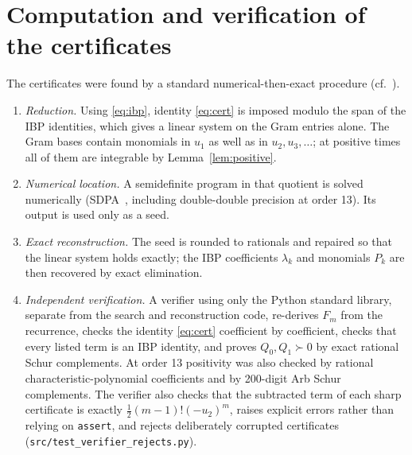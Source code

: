 \documentclass[11pt]{article}
\theoremstyle{definition}
\theoremstyle{remark}
\begin{document}
\section{Computation and verification of the certificates}\label{sec:computation}
The certificates were found by a standard numerical-then-exact procedure
(cf.~\cite{Parrilo03,PeyrlParrilo08}).
\begin{enumerate}[label=(\arabic*)]
\item \emph{Reduction.} Using \eqref{eq:ibp}, identity \eqref{eq:cert} is imposed
 modulo the span of the IBP identities, which gives a linear system on the Gram
 entries alone. The Gram bases contain monomials in $u_1$ as well as in
 $u_2,u_3,\dots$; at positive times all of them are integrable by
 Lemma~\ref{lem:positive}.
\item \emph{Numerical location.} A semidefinite program in that quotient is solved
 numerically (SDPA~\cite{SDPA03}, including double-double precision at order 13).
 Its output is used only as a seed.
\item \emph{Exact reconstruction.} The seed is rounded to rationals and repaired so
 that the linear system holds exactly; the IBP coefficients $\lambda_k$ and monomials
 $P_k$ are then recovered by exact elimination.
\item \emph{Independent verification.} A verifier using only the Python standard
 library, separate from the search and reconstruction code, re-derives $F_m$ from
 the recurrence, checks the identity \eqref{eq:cert} coefficient by coefficient,
 checks that every listed term is an IBP identity, and proves $Q_0,Q_1\succ0$ by
 exact rational Schur complements. At order 13 positivity was also checked by
 rational characteristic-polynomial coefficients and by 200-digit Arb Schur
 complements. The verifier also checks that the subtracted term of each sharp
 certificate is exactly $\tfrac12(m-1)!(-u_2)^m$, raises explicit errors rather than
 relying on \texttt{assert}, and rejects deliberately corrupted certificates
 (\texttt{src/test\_verifier\_rejects.py}).
\end{enumerate}
\end{document}
